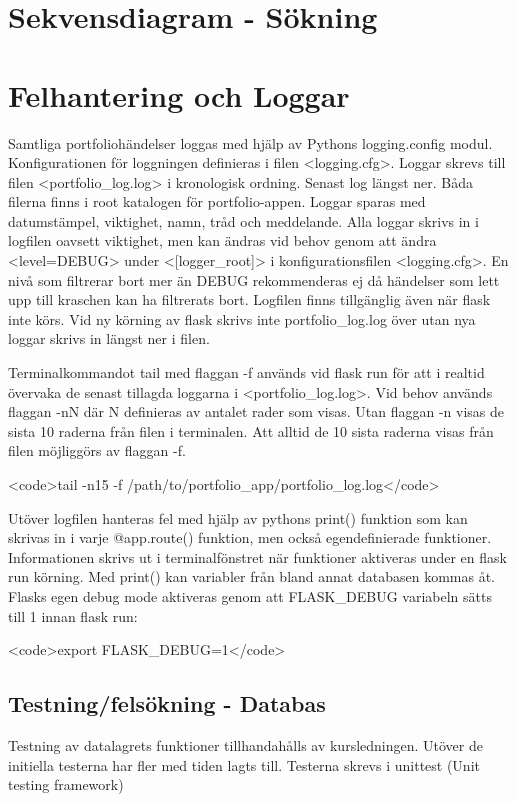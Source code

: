\documentclass{TDP003mall}
\begin{document}
\section{Sekvensdiagram - Sökning}



\section{Felhantering och Loggar}
Samtliga portfoliohändelser loggas med hjälp av Pythons logging.config modul. Konfigurationen för loggningen definieras i filen <logging.cfg>. Loggar skrevs till filen <portfolio\_log.log> i kronologisk ordning. Senast log längst ner. Båda filerna finns i root katalogen för portfolio-appen. Loggar sparas med datumstämpel, viktighet, namn, tråd och meddelande. Alla loggar skrivs in i logfilen oavsett viktighet, men kan ändras vid behov genom att ändra <level=DEBUG> under <[logger\_root]> i konfigurationsfilen <logging.cfg>. En nivå som filtrerar bort mer än DEBUG rekommenderas ej då händelser som lett upp till kraschen kan ha filtrerats bort. Logfilen finns tillgänglig även när flask inte körs. Vid ny körning av flask skrivs inte portfolio\_log.log över utan nya loggar skrivs in längst ner i filen.

Terminalkommandot tail med flaggan -f används vid flask run för att i realtid övervaka de senast tillagda loggarna i <portfolio\_log.log>. Vid behov används flaggan -nN där N definieras av antalet rader som visas. Utan flaggan -n visas de sista 10 raderna från filen i terminalen. Att alltid de 10 sista raderna visas från filen möjliggörs av flaggan -f.

<code>tail -n15 -f /path/to/portfolio_app/portfolio_log.log</code>

Utöver logfilen hanteras fel med hjälp av pythons print() funktion som kan skrivas in i varje @app.route() funktion, men också egendefinierade funktioner. Informationen skrivs ut i terminalfönstret när funktioner aktiveras under en flask run körning. Med print() kan variabler från bland annat databasen kommas åt. Flasks egen debug mode aktiveras genom att FLASK_DEBUG variabeln sätts till 1 innan flask run:

<code>export FLASK_DEBUG=1</code>

\subsection{Testning/felsökning - Databas}
Testning av datalagrets funktioner tillhandahålls av kursledningen. Utöver de initiella testerna har fler med tiden lagts till. Testerna skrevs i unittest (Unit testing framework)
\end{document}
